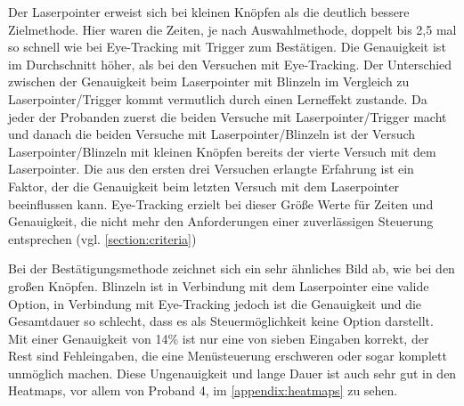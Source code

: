Der Laserpointer erweist sich bei kleinen Knöpfen als die deutlich bessere Zielmethode. Hier waren die Zeiten, je nach Auswahlmethode, doppelt bis 2,5 mal so schnell wie bei Eye-Tracking mit Trigger zum Bestätigen. Die Genauigkeit ist im Durchschnitt höher, als bei den Versuchen mit Eye-Tracking. Der Unterschied zwischen der Genauigkeit beim Laserpointer mit Blinzeln im Vergleich zu Laserpointer/Trigger kommt vermutlich durch einen Lerneffekt zustande. Da jeder der Probanden zuerst die beiden Versuche mit Laserpointer/Trigger macht und danach die beiden Versuche mit Laserpointer/Blinzeln ist der Versuch Laserpointer/Blinzeln mit kleinen Knöpfen bereits der vierte Versuch mit dem Laserpointer. Die aus den ersten drei Versuchen erlangte Erfahrung ist ein Faktor, der die Genauigkeit beim letzten Versuch mit dem Laserpointer beeinflussen kann. Eye-Tracking erzielt bei dieser Größe Werte für Zeiten und Genauigkeit, die nicht mehr den Anforderungen einer zuverlässigen Steuerung entsprechen (vgl. \autoref{section:criteria})

Bei der Bestätigungsmethode zeichnet sich ein sehr ähnliches Bild ab, wie bei den großen Knöpfen. Blinzeln ist in Verbindung mit dem Laserpointer eine valide Option, in Verbindung mit Eye-Tracking jedoch ist die Genauigkeit und die Gesamtdauer so schlecht, dass es als Steuermöglichkeit keine Option darstellt. Mit einer Genauigkeit von 14\% ist nur eine von sieben Eingaben korrekt, der Rest sind Fehleingaben, die eine Menüsteuerung erschweren oder sogar komplett unmöglich machen. Diese Ungenauigkeit und lange Dauer ist auch sehr gut in den Heatmaps, vor allem von Proband 4, im \autoref{appendix:heatmaps}  zu sehen.

